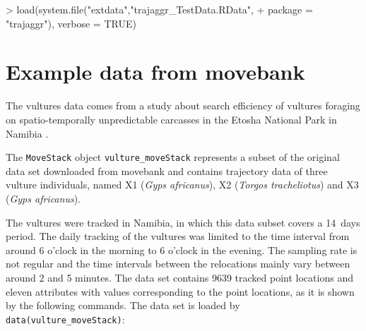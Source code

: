 \documentclass[12pt, oneside, a4paper]{scrbook}
\let\code=\texttt
\begin{document}
\begin{small}
\begin{Schunk}
\begin{Sinput}
> load(system.file("extdata","trajaggr_TestData.RData", 
+                  package = "trajaggr"), verbose = TRUE)
\end{Sinput}
\end{Schunk}
\end{small}

\par\medskip



\section{Example data from movebank}
\label{sec:exampledatamovebank}



The vultures data comes from a study about search efficiency of vultures foraging on spatio-temporally unpredictable carcasses in the Etosha National Park in Namibia \citep{spiegel_factors_2013, spiegel2014data}.
\par\medskip

The \code{MoveStack} object \code{vulture\_moveStack} represents a subset of the original data set downloaded from movebank and contains trajectory data of three vulture individuals, named X1 (\textit{Gyps africanus}), X2 (\textit{Torgos tracheliotus}) and X3 (\textit{Gyps africanus}). 
\par\medskip

The vultures were tracked in Namibia, in which this data subset covers a 14~days period. The daily tracking of the vultures was limited to the time interval from around 6 o'clock in the morning to 6 o'clock in the evening. The sampling rate is not regular and the time intervals between the relocations mainly vary between around 2 and 5 minutes. The data set contains 9639 tracked point locations and eleven attributes with values corresponding to the point locations, as it is shown by the following commands. The data set is loaded by \code{data(vulture\_moveStack)}:
\par\medskip
\end{document}

